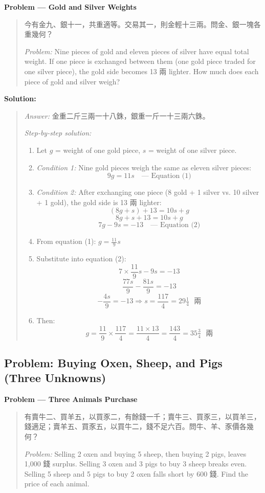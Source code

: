 \documentclass[11pt,a4paper]{article}
\newcommand{\zh}[1]{{#1}}
\newenvironment{chproblem}[1][]{%
  \par\medskip\noindent\textbf{\textcolor{sectioncolor}{#1}}\par\nopagebreak
  \begin{quote}\small
}{%
  \end{quote}\medskip
}
\newenvironment{chsolution}{%
  \par\medskip\noindent\textbf{\textcolor{notecolor}{Solution:}}\par\nopagebreak
  \begin{quote}\small
}{%
  \end{quote}\medskip
}
\newenvironment{stepbystep}{%
  \par\smallskip\noindent\textit{Step-by-step solution:}\par\nopagebreak
  \begin{enumerate}[leftmargin=2em,label=\textbf{Step \arabic*:},ref=\arabic*]
}{%
  \end{enumerate}\medskip
}
\begin{document}
\begin{chproblem}[Problem --- Gold and Silver Weights]
\zh{今有金九、銀十一，共重適等。交易其一，則金輕十三兩。問金、銀一塊各重幾何？}

\medskip
\textit{Problem:} Nine pieces of gold and eleven pieces of silver have equal
total weight. If one piece is exchanged between them (one gold piece traded
for one silver piece), the gold side becomes 13 \zh{兩} lighter. How much does
each piece of gold and silver weigh?
\end{chproblem}

\begin{chsolution}
\textit{Answer:} \zh{金重二斤三兩一十八銖，銀重一斤一十三兩六銖。}

\begin{stepbystep}
\item Let $g$ = weight of one gold piece, $s$ = weight of one silver piece.

\item \textit{Condition 1:} Nine gold pieces weigh the same as eleven silver pieces:
\[
9g = 11s \quad \text{--- Equation (1)}
\]

\item \textit{Condition 2:} After exchanging one piece (8 gold + 1 silver vs.
10 silver + 1 gold), the gold side is 13 \zh{兩} lighter:
\[
(8g + s) + 13 = 10s + g
\]
\[
8g + s + 13 = 10s + g
\]
\[
7g - 9s = -13 \quad \text{--- Equation (2)}
\]

\item From equation (1): $g = \frac{11}{9}s$

\item Substitute into equation (2):
\[
7 \times \frac{11}{9}s - 9s = -13
\]
\[
\frac{77s}{9} - \frac{81s}{9} = -13
\]
\[
-\frac{4s}{9} = -13 \Rightarrow s = \frac{117}{4} = 29\tfrac{1}{4} \text{ \zh{兩}}
\]

\item Then:
\[
g = \frac{11}{9} \times \frac{117}{4} = \frac{11 \times 13}{4} = \frac{143}{4} = 35\tfrac{3}{4} \text{ \zh{兩}}
\]
\end{stepbystep}
\end{chsolution}

\subsection{Problem: Buying Oxen, Sheep, and Pigs (Three Unknowns)}

\begin{chproblem}[Problem --- Three Animals Purchase]
\zh{有賣牛二、買羊五，以買豕二，有餘錢一千；賣牛三、買豕三，以買羊三，錢適足；賣羊五、買豕五，以買牛二，錢不足六百。問牛、羊、豕價各幾何？}

\medskip
\textit{Problem:} Selling 2 oxen and buying 5 sheep, then buying 2 pigs,
leaves 1,000 \zh{錢} surplus. Selling 3 oxen and 3 pigs to buy 3 sheep
breaks even. Selling 5 sheep and 5 pigs to buy 2 oxen falls short by 600
\zh{錢}. Find the price of each animal.
\end{chproblem}
\end{document}
